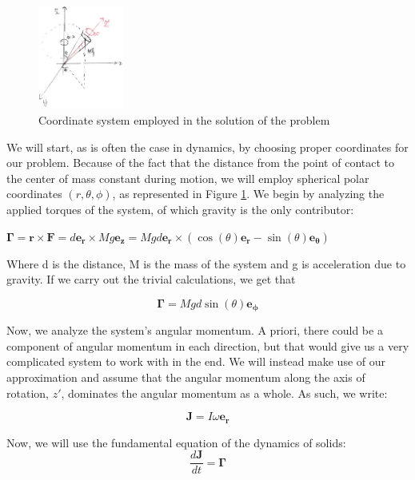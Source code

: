 \documentclass[a4paper,12pt]{article}
\begin{document}
\begin{figure}[h!]
\centering
\includegraphics[width=0.25\textwidth]{coord.jpg}
\caption{Coordinate system employed in the solution of the problem}
\label{coord_system}
\end{figure} 

We will start, as is often the case in dynamics, by choosing proper coordinates for our problem. Because of the fact that the distance from the point of contact to the center of mass constant during motion, we will employ spherical polar coordinates $(r,\theta,\phi)$, as represented in Figure \ref{coord_system}. We begin by analyzing the applied torques of the system, of which gravity is the only contributor:

$\boldsymbol{\Gamma} = \boldsymbol{r} \times \boldsymbol{F} = d \boldsymbol{e_r} \times M g \boldsymbol{e_z} = M g d \boldsymbol{e_r} \times (\cos(\theta) \boldsymbol{e_r}-\sin(\theta) \boldsymbol{e_\theta})$

Where d is the distance, M is the mass of the system and g is acceleration due to gravity. If we carry out the trivial calculations, we get that 

\begin{equation}
	\label{torque}
	\boldsymbol{\Gamma} = M g d \sin(\theta) \boldsymbol{e_{\phi}}
\end{equation}

Now, we analyze the system's angular momentum. A priori, there could be a component of angular momentum in each direction, but that would give us a very complicated system to work with in the end. We will instead make use of our approximation and assume that the angular momentum along the axis of rotation, $z'$, dominates the angular momentum as a whole. As such, we write:

\begin{equation}
\label{angular}
	\boldsymbol{J} = I \omega \boldsymbol{e_r}
\end{equation}

Now, we will use the fundamental equation of the dynamics of solids:
\begin{equation}
	\label{fund}
	\frac{d \boldsymbol{J}}{dt} = \boldsymbol{\Gamma}	
\end{equation}
\end{document}
